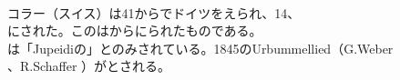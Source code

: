 \documentclass[10pt,b5j]{tarticle} %
\begin{document}
\begin{enumerate}
\begin{minipage}[c]{\blocksize}
        
    \end{minipage}
    \begin{minipage}[c]{\blocksize}
        
        \vspace{\linespace}
        \item~\\
        コラー（スイス）は41からでドイツをえられ、14、\\
        にされた。このはからにられたものである。\\
        は「Jupeidiの」とのみされている。1845のUrbummellied（G.Weber\\
        、R.Schaffer ）がとされる。
    
    \end{minipage}
\end{enumerate} %
\end{document}
